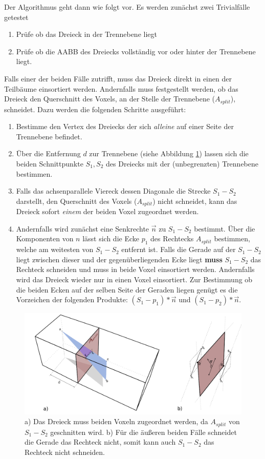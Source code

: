 Der Algorithmus geht dann wie folgt vor. Es werden zunächst zwei Trivialfälle getestet
\begin{enumerate}
 \item Prüfe ob das Dreieck in der Trennebene liegt
 \item Prüfe ob die AABB des Dreiecks vollständig vor oder hinter der Trennebene liegt.
\end{enumerate}
Falls einer der beiden Fälle zutrifft, muss das Dreieck direkt in einen der Teilbäume einsortiert werden.
Andernfalls muss festgestellt werden, ob das Dreieck den Querschnitt des Voxels, an der Stelle der Trennebene ($A_{split}$), schneidet. Dazu werden die folgenden Schritte ausgeführt:
\begin{enumerate}
 \item Bestimme den Vertex des Dreiecks der sich \textit{alleine} auf einer Seite der Trennebene befindet.
 \item Über die Entfernung $d$ zur Trennebene (siehe Abbildung \ref{fig:splitvoxel}) lassen sich die beiden Schnittpunkte $S_1, S_2$ des Dreiecks mit der (unbegrenzten) Trennebene bestimmen.
 \item Falls das achsenparallele Viereck dessen Diagonale die Strecke $S_1-S_2$ darstellt, den Querschnitt des Voxels ($A_{split}$) nicht schneidet, kann das Dreieck sofort \textit{einem} der beiden Voxel zugeordnet werden.
 \item Andernfalls wird zunächst eine Senkrechte $\vec{n}$ zu $S_1-S_2$ bestimmt. Über die Komponenten von $n$ lässt sich die Ecke $p_1$ des Rechtecks $A_{split}$ bestimmen, welche am weitesten von $S_1-S_2$ entfernt ist. Falls die Gerade auf der $S_1-S_2$ liegt zwischen dieser und der gegenüberliegenden Ecke liegt \textbf{muss} $S_1-S_2$ das Rechteck schneiden und muss in beide Voxel einsortiert werden. Andernfalls wird das Dreieck wieder nur in einen Voxel einsortiert. Zur Bestimmung ob die beiden Ecken auf der selben Seite der Geraden liegen genügt es die Vorzeichen der folgenden Produkte: $(S_1 - p_1) * \vec{n}$ und $(S_1 - p_2) * \vec{n}$.
\end{enumerate}

\begin{figure}\centering
\includegraphics[width=1.0\textwidth]{images/split.pdf} 
\caption[Effizienter Dreieck/Subvoxel Schnittest]{a) Das Dreieck muss beiden Voxeln zugeordnet werden, da $A_{split}$ von $S_1-S_2$ geschnitten wird. b) Für die äußeren beiden Fälle schneidet die Gerade das Rechteck nicht, somit kann auch $S_1-S_2$ das Rechteck nicht schneiden.}
\label{fig:splitvoxel}
\end{figure}

